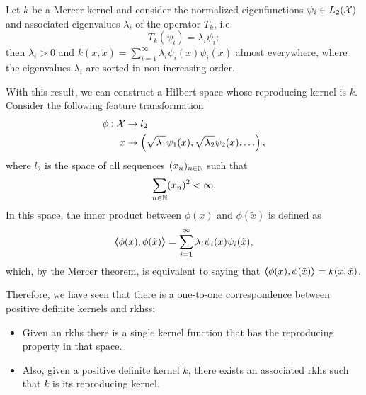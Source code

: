 \begin{theorem}    
Let $k$ be a Mercer kernel and consider the normalized eigenfunctions $\psi_i \in L_2(\mathcal{X})$ and associated eigenvalues $\lambda_i$ of the operator $T_k$, i.e.
$$ T_k(\psi_i) = \lambda_i \psi_i ; $$
then $\lambda_i > 0$ and $k(x, \tilde{x}) = \sum_{i=1}^\infty \lambda_i \psi_i(x) \psi_i(\tilde{x})$ almost everywhere, where the eigenvalues $\lambda_i$ are sorted in non-increasing order. 
\end{theorem}
%
With this result, we can construct a Hilbert space whose reproducing kernel is $k$.
Consider the following feature transformation
\begin{equation}
    \begin{aligned}
        \nonumber
        \phi: \mathcal{X} &\to l_2 \\
        x &\to \left(\sqrt{\lambda_1} \psi_1(x), \sqrt{\lambda_2} \psi_2(x), \ldots \right) ,
    \end{aligned}
\end{equation}
where $l_2$ is the space of all sequences $(x_n)_{n \in \mathbb{N}}$ such that $$ \sum_{n \in \mathbb{N}} (x_n)^2 < \infty .$$
In this space, the inner product between $\phi(x)$ and $\phi(\tilde{x})$ is defined as
$$ \bm{\left\langle} \phi(x), \phi(\tilde{x}) \bm{\right\rangle} = \sum_{i=1}^\infty \lambda_i \psi_i(x) \psi_i(\tilde{x}),$$ which, by the Mercer theorem, is equivalent to saying that $\bm{\left\langle} \phi(x), \phi(\tilde{x}) \bm{\right\rangle} = k(x, \tilde{x})$.

Therefore, we have seen that there is a one-to-one correspondence between positive definite kernels and \acrshort{rkhss}: 
\begin{itemize}
    \item Given an \acrshort{rkhs} there is a single kernel function that has the reproducing property in that space.
    \item Also, given a positive definite kernel $k$, there exists an associated \acrshort{rkhs} such that $k$ is its reproducing kernel. 
\end{itemize}










